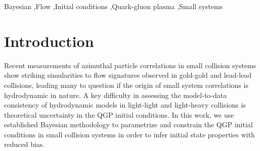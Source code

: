 \documentclass[3p,times,procedia]{elsarticle}
\begin{document}
\begin{frontmatter}
\begin{keyword}
  Bayesian \sep Flow \sep Initial conditions \sep Quark-gluon plasma \sep Small systems


\end{keyword}

\end{frontmatter}


\section{Introduction}
\label{}

Recent measurements of azimuthal particle correlations in small collision systems show striking simularities to flow signatures observed in gold-gold and lead-lead collisions, leading many to question if the origin of small system correlations is hydrodynamic in nature.
A key difficulty in assessing the model-to-data consistency of hydrodynamic models in light-light and light-heavy collisions is theoretical uncertainty in the QGP initial conditions.
In this work, we use established Bayesian methodology to parametrize and constrain the QGP initial conditions in small collision systems in order to infer initial state properties with reduced bias.
\end{document}
